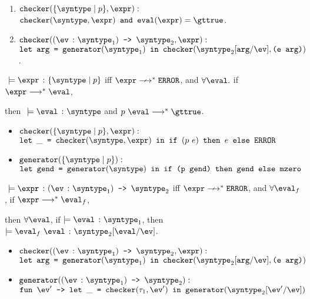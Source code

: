 \begin{definition}
  \label{def_cheExt}
  \ \par 
  \begin{enumerate}
    \item $\mkche{\mktset{\syntype}{p}}{\expr} : $\\ 
    $\mkche{\syntype}{\expr} \texttt{ and } \evaluate{\expr} = \gttrue$.
    \item $\mkche{\mkdfun{\ev}{\syntype_1}{\syntype_2}}{\expr} :$\\ 
    $\texttt{let arg = } \mkgen{\syntype_1} \texttt{ in } \mkche{\substitute{\syntype_2}{\texttt{arg}}{\ev}}{\texttt{(e arg)}}$.
  \end{enumerate}
\end{definition}

\begin{definition}
  $\ \models \hastype{\expr}{\mktset{\syntype}{p}}$ iff $\expr \nsmallsteps[] \eerror$, and $\forall \eval.$ if $\expr \smallsteps[] \eval$, 
  
  then $\ \models \hastype{\eval}{\syntype}$ and $p \ \eval \smallsteps[] \gttrue$.

  \begin{itemize}
    \item $\mkche{\mktset{\syntype}{p}}{\expr} : $\\ 
    $\letin{\_}{\mkche{\syntype}{\expr}}{\ife{(p \  e)}{e}{\eerror}}$
    \item $\mkgen{\mktset{\syntype}{p}} : $ \\ 
    $\texttt{let gend = }\mkgen{\syntype} \texttt{ in } \ife{\texttt{(p gend)}}{\texttt{gend}}{\mzero}$
  \end{itemize}
\end{definition}

\pagebreak

\begin{definition}
  $\ \models \hastype{\expr}{\mkdfun{\ev}{\syntype_1}{\syntype_2}}$ iff $\expr \nsmallsteps[] \eerror$, and $\forall{\eval_f}$, if $\expr \smallsteps[] \eval_f$, 
  
  then $\forall \eval$, if $\models \hastype{\eval}{\syntype_1}$, then $\models \hastype{\eval_f\ \eval}{\substitute{\syntype_2}{\eval}{\ev}}$.

  \begin{itemize}
    \item $\mkche{\mkdfun{\ev}{\syntype_1}{\syntype_2}}{\expr} :$\\ 
    $\texttt{let arg = } \mkgen{\syntype_1} \texttt{ in } \mkche{\substitute{\syntype_2}{\texttt{arg}}{\ev}}{\texttt{(e arg)}}$
    \item $\mkgen{\mkdfun{\ev}{\syntype_1}{\syntype_2}} : $
    \\$\mkfunv{\ev'}{\letin{\_}{\mkche{\tau_1}{\ev'}}{\mkgen{\substitute{\syntype_2}{\ev'}{\ev}}}}$
  \end{itemize}
\end{definition}

